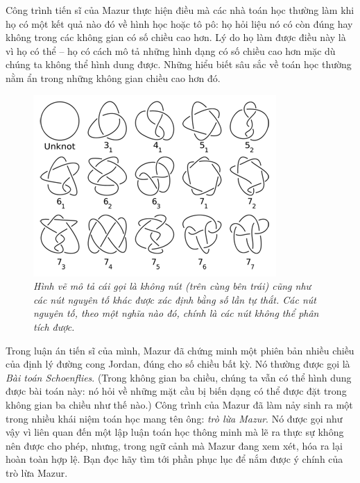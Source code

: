 \begin{multicols}{2}
	\vskip 0.05cm
	Công trình tiến sĩ của Mazur thực hiện điều mà các nhà toán học thường làm khi họ có một kết quả nào đó về hình học hoặc tô pô: họ hỏi liệu nó có còn đúng hay không trong các không gian có số chiều cao hơn. Lý do họ làm được điều này là vì họ có thể -- họ có cách mô tả những hình dạng có số chiều cao hơn mặc dù chúng ta không thể hình dung được. Những hiểu biết sâu sắc về toán học thường nằm ẩn trong những không gian chiều cao hơn đó.
	\begin{figure}[H]
		\centering
		\vspace*{-5pt}
		\captionsetup{labelformat= empty, justification=centering}
		\includegraphics[width=0.85\linewidth]{2}
		\caption{\small\textit{\color{duongvaotoanhoc}Hình vẽ  mô tả cái gọi là không nút  (trên cùng bên trái) cũng như các nút nguyên tố khác được xác định bằng số lần tự thắt. Các nút nguyên tố, theo một nghĩa nào đó, chính là các nút không thể phân tích được.}}
		\vspace*{-10pt}
	\end{figure}
	Trong luận án tiến sĩ của mình, Mazur đã chứng minh một phiên bản nhiều chiều của định lý đường cong Jordan, đúng cho số chiều bất kỳ. Nó thường được gọi là \textit{Bài toán Schoenflies}. (Trong không gian ba chiều, chúng ta vẫn có thể hình dung được bài toán này: nó hỏi về những mặt cầu bị biến dạng có thể được đặt trong không gian ba chiều như thế nào.)
	\vskip 0.05cm
	Công trình của Mazur đã làm nảy sinh ra một trong nhiều khái niệm toán học  mang tên ông: \textit{trò lừa Mazur}. Nó được gọi như vậy vì liên quan đến một lập luận toán học thông minh mà lẽ ra thực sự không nên được cho phép, nhưng, trong ngữ cảnh mà Mazur đang xem xét, hóa ra lại hoàn toàn hợp lệ. Bạn đọc hãy tìm tới phần phục lục để nắm được ý chính của trò lừa Mazur.

\end{multicols}
